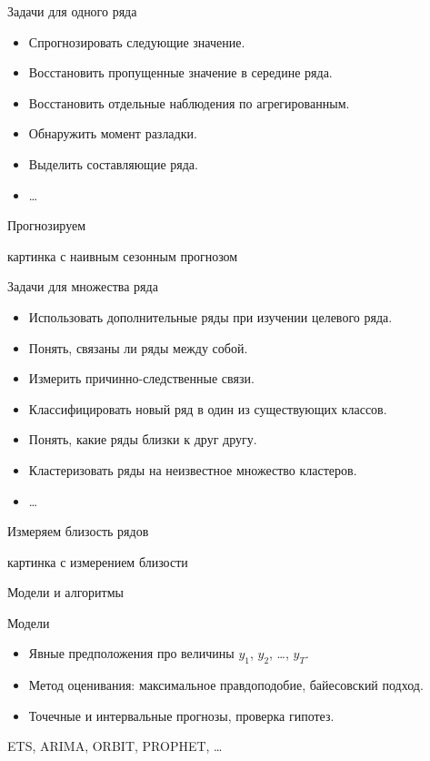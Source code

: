 \begin{frame}{Задачи для одного ряда}

\begin{itemize}[<+->]
  \item Спрогнозировать следующие значение.
  \item Восстановить пропущенные значение в середине ряда.
  \item Восстановить отдельные наблюдения по агрегированным.
  \item Обнаружить момент разладки.
  \item Выделить составляющие ряда. 
  \item \ldots 
\end{itemize}

\end{frame}


\begin{frame}{Прогнозируем}

  картинка с наивным сезонным прогнозом

\end{frame}


\begin{frame}{Задачи для множества ряда}

  \begin{itemize}[<+->]
    \item Использовать дополнительные ряды при изучении целевого ряда.
    \item Понять, связаны ли ряды между собой.
    \item Измерить причинно-следственные связи.
    \item Классифицировать новый ряд в один из существующих классов.
    \item Понять, какие ряды близки к друг другу.
    \item Кластеризовать ряды на неизвестное множество кластеров.
    \item \ldots
  \end{itemize}
  
\end{frame}
  
\begin{frame}{Измеряем близость рядов}

  картинка с измерением близости

\end{frame}



\begin{frame}{Модели и алгоритмы}

\begin{block}{Модели}
\begin{itemize}[<+->]
  \item Явные предположения про величины $y_1$, $y_2$, \ldots, $y_T$.
  \item Метод оценивания: максимальное правдоподобие, байесовский подход.
  \item Точечные и интервальные прогнозы, проверка гипотез. 
\end{itemize}
\end{block}

ETS, ARIMA, ORBIT, PROPHET, \ldots

\end{frame}

